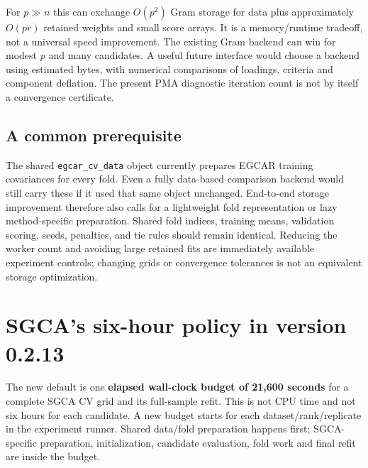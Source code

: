 \documentclass[
  11pt,
]{article}
\begin{document}
For \(p\gg n\) this can exchange \(O(p^2)\) Gram storage for data plus
approximately \(O(pr)\) retained weights and small score arrays. It is a
memory/runtime tradeoff, not a universal speed improvement. The existing
Gram backend can win for modest \(p\) and many candidates. A useful
future interface would choose a backend using estimated bytes, with
numerical comparisons of loadings, criteria and component deflation. The
present PMA diagnostic iteration count is not by itself a convergence
certificate.

\hypertarget{a-common-prerequisite}{%
\subsection{A common prerequisite}\label{a-common-prerequisite}}

The shared \texttt{egcar\_cv\_data} object currently prepares EGCAR
training covariances for every fold. Even a fully data-based comparison
backend would still carry these if it used that same object unchanged.
End-to-end storage improvement therefore also calls for a lightweight
fold representation or lazy method-specific preparation. Shared fold
indices, training means, validation scoring, seeds, penalties, and tie
rules should remain identical. Reducing the worker count and avoiding
large retained fits are immediately available experiment controls;
changing grids or convergence tolerances is not an equivalent storage
optimization.

\hypertarget{sgcas-six-hour-policy-in-version-0.2.13}{%
\section{SGCA's six-hour policy in version
0.2.13}\label{sgcas-six-hour-policy-in-version-0.2.13}}

The new default is one \textbf{elapsed wall-clock budget of 21,600
seconds} for a complete SGCA CV grid and its full-sample refit. This is
not CPU time and not six hours for each candidate. A new budget starts
for each dataset/rank/replicate in the experiment runner. Shared
data/fold preparation happens first; SGCA-specific preparation,
initialization, candidate evaluation, fold work and final refit are
inside the budget.
\end{document}
